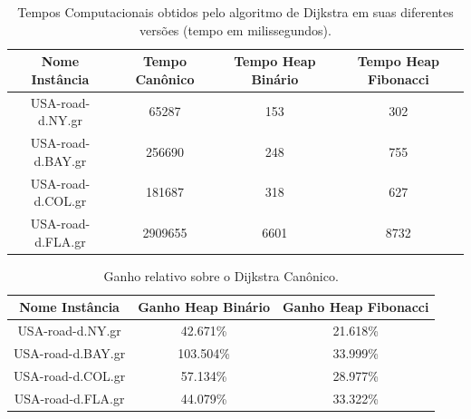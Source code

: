 \begin{table}[H]
\caption{Tempos Computacionais obtidos pelo algoritmo de Dijkstra em suas diferentes versões (tempo em milissegundos).}
\label{tbl-dijkstra-resultados-tempos}
\centering
\begin{adjustbox}{max width=\textwidth}
\begin{tabular}{|c|c|c|c|}
\hline
\textbf{Nome Instância} & \textbf{Tempo Canônico} & \textbf{Tempo Heap Binário} & \textbf{Tempo Heap Fibonacci} \\ \hline
USA-road-d.NY.gr        & 65287                   & 153                         & 302                           \\ \hline
USA-road-d.BAY.gr       & 256690                  & 248                         & 755                           \\ \hline
USA-road-d.COL.gr       & 181687                  & 318                         & 627                           \\ \hline
USA-road-d.FLA.gr       & 2909655                 & 6601                        & 8732                          \\ \hline
\end{tabular}
\end{adjustbox}
\end{table}


\begin{table}[H]
\caption{Ganho relativo sobre o Dijkstra Canônico.}
\label{tbl-dijkstra-resultados-speedup}
\centering
\begin{adjustbox}{max width=\textwidth}
\begin{tabular}{|c|c|c|}
\hline
\textbf{Nome Instância} & \textbf{Ganho Heap Binário} & \textbf{Ganho Heap Fibonacci} \\ \hline
USA-road-d.NY.gr        & 42.671\%                       & 21.618\%                         \\ \hline
USA-road-d.BAY.gr       & 103.504\%                      & 33.999\%                         \\ \hline
USA-road-d.COL.gr       & 57.134\%                       & 28.977\%                         \\ \hline
USA-road-d.FLA.gr       & 44.079\%                       & 33.322\%                         \\ \hline
\end{tabular}
\end{adjustbox}
\end{table}

